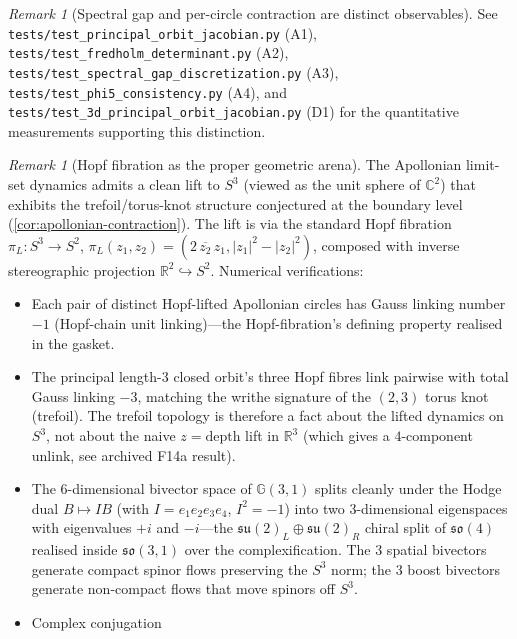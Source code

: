 \documentclass[11pt,a4paper]{article}
\theoremstyle{plain}
\theoremstyle{definition}
\theoremstyle{remark}
\newtheorem{remark}[theorem]{Remark}
\numberwithin{equation}{section}
\newcommand{\Cl}{\mathbb{G}}
\begin{document}
\begin{remark}[Spectral gap and per-circle contraction are distinct observables]
\begin{sloppypar}
See \texttt{tests/}\allowbreak\texttt{test\_principal\_orbit\_jacobian.py} (A1),
\texttt{tests/}\allowbreak\texttt{test\_fredholm\_determinant.py} (A2),
\texttt{tests/}\allowbreak\texttt{test\_spectral\_gap\_discretization.py} (A3),
\texttt{tests/}\allowbreak\texttt{test\_phi5\_consistency.py} (A4), and
\texttt{tests/}\allowbreak\texttt{test\_3d\_principal\_orbit\_jacobian.py} (D1)
for the quantitative measurements supporting this distinction.
\end{sloppypar}
\end{remark}

\begin{remark}[Hopf fibration as the proper geometric arena]
\label{rmk:hopf-geometric-arena}
The Apollonian limit-set dynamics admits a clean lift to \(S^3\)
(viewed as the unit sphere of \(\mathbb{C}^2\)) that exhibits the
trefoil/torus-knot structure conjectured at the boundary level
(\cref{cor:apollonian-contraction}).  The lift is via the standard
Hopf fibration \(\pi_L:S^3\to S^2\),
\(\pi_L(z_1,z_2)=(2\,\overline{z_2}\,z_1,|z_1|^2-|z_2|^2)\), composed
with inverse stereographic projection
\(\mathbb{R}^2\hookrightarrow S^2\).  Numerical verifications:
\begin{itemize}
\item Each pair of distinct Hopf-lifted Apollonian circles has Gauss
  linking number \(-1\) (Hopf-chain unit linking)---the
  Hopf-fibration's defining property realised in the gasket.
\item The principal length-3 closed orbit's three Hopf fibres link
  pairwise with total Gauss linking \(-3\), matching the writhe
  signature of the \((2,3)\) torus knot (trefoil).  The trefoil
  topology is therefore a fact about the lifted dynamics on \(S^3\),
  not about the naive \(z=\text{depth}\) lift in \(\mathbb{R}^3\)
  (which gives a \(4\)-component unlink, see archived F14a result).
\item The 6-dimensional bivector space of \(\Cl(3,1)\) splits
  cleanly under the Hodge dual \(B\mapsto IB\) (with
  \(I=e_1e_2e_3e_4\), \(I^2=-1\)) into two 3-dimensional
  eigenspaces with eigenvalues \(+i\) and \(-i\)---the
  \(\mathfrak{su}(2)_L\oplus\mathfrak{su}(2)_R\) chiral split of
  \(\mathfrak{so}(4)\) realised inside \(\mathfrak{so}(3,1)\) over
  the complexification.  The 3 spatial bivectors generate compact
  spinor flows preserving the \(S^3\) norm; the 3 boost bivectors
  generate non-compact flows that move spinors off \(S^3\).
\item Complex conjugation

\end{itemize}
\end{remark}
\end{document}
